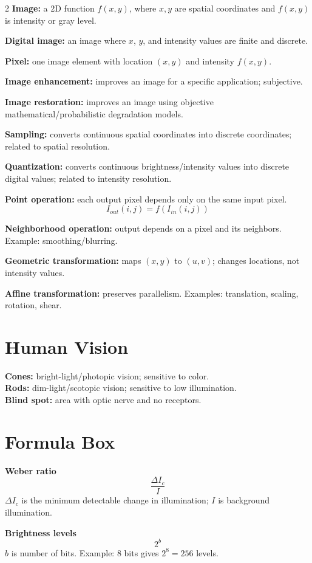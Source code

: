 \documentclass[8pt]{extarticle}
\begin{document}
\begin{multicols}{2}
\textbf{Image:} a 2D function $f(x,y)$, where $x,y$ are spatial coordinates and $f(x,y)$ is intensity or gray level.

\textbf{Digital image:} an image where $x$, $y$, and intensity values are finite and discrete.

\textbf{Pixel:} one image element with location $(x,y)$ and intensity $f(x,y)$.

\textbf{Image enhancement:} improves an image for a specific application; subjective.

\textbf{Image restoration:} improves an image using objective mathematical/probabilistic degradation models.

\textbf{Sampling:} converts continuous spatial coordinates into discrete coordinates; related to spatial resolution.

\textbf{Quantization:} converts continuous brightness/intensity values into discrete digital values; related to intensity resolution.

\textbf{Point operation:} each output pixel depends only on the same input pixel.
\[
I_{out}(i,j)=f(I_{in}(i,j))
\]

\textbf{Neighborhood operation:} output depends on a pixel and its neighbors. Example: smoothing/blurring.

\textbf{Geometric transformation:} maps $(x,y)$ to $(u,v)$; changes locations, not intensity values.

\textbf{Affine transformation:} preserves parallelism. Examples: translation, scaling, rotation, shear.

\section{Human Vision}

\textbf{Cones:} bright-light/photopic vision; sensitive to color.\\
\textbf{Rods:} dim-light/scotopic vision; sensitive to low illumination.\\
\textbf{Blind spot:} area with optic nerve and no receptors.

\section{Formula Box}

\textbf{Weber ratio}
\[
\frac{\Delta I_c}{I}
\]
$\Delta I_c$ is the minimum detectable change in illumination; $I$ is background illumination.

\textbf{Brightness levels}
\[
2^b
\]
$b$ is number of bits. Example: $8$ bits gives $2^8=256$ levels.


\end{multicols}
\end{document}
